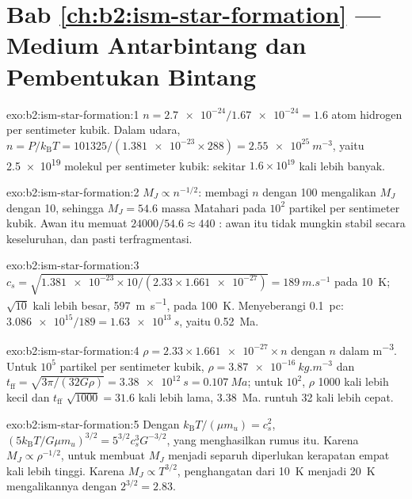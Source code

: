 \section*{Bab \ref{ch:b2:ism-star-formation} --- Medium Antarbintang dan Pembentukan Bintang}

\begin{solution}{exo:b2:ism-star-formation:1}
$n = \num{2.7e-24}/\num{1.67e-24} = 1.6$ atom hidrogen per sentimeter kubik. Dalam udara,
$n = P/k_{\mathrm B}T = 101325/(\num{1.381e-23}\times288) = \qty{2.55e25}{m^{-3}}$,
yaitu \num{2.5e19} molekul per sentimeter kubik: sekitar $1.6\times10^{19}$ kali
lebih banyak.
\end{solution}

\begin{solution}{exo:b2:ism-star-formation:2}
$M_J \propto n^{-1/2}$: membagi $n$ dengan 100 mengalikan $M_J$ dengan 10, sehingga
$M_J = 54.6$ massa Matahari pada $10^2$ partikel per sentimeter kubik. Awan itu memuat
$\num{24000}/54.6 \approx 440$ : awan itu tidak mungkin stabil secara keseluruhan, dan pasti
terfragmentasi.
\end{solution}

\begin{solution}{exo:b2:ism-star-formation:3}
$c_s = \sqrt{\num{1.381e-23}\times10/(2.33\times\num{1.661e-27})} =
\qty{189}{m.s^{-1}}$ pada \qty{10}{K}; $\sqrt{10}$ kali lebih besar, \qty{597}{m.s^{-1}},
pada \qty{100}{K}. Menyeberangi \qty{0.1}{pc}: $\num{3.086e15}/189 = \qty{1.63e13}{s}$,
yaitu \qty{0.52}{Ma}.
\end{solution}

\begin{solution}{exo:b2:ism-star-formation:4}
$\rho = 2.33\times\num{1.661e-27}\times n$ dengan $n$ dalam \unit{m^{-3}}. Untuk $10^5$
partikel per sentimeter kubik, $\rho = \qty{3.87e-16}{kg.m^{-3}}$ dan
$t_{\mathrm{ff}} = \sqrt{3\pi/(32G\rho)} = \qty{3.38e12}{s} = \qty{0.107}{Ma}$; untuk
$10^2$, $\rho$ \num{1000} kali lebih kecil dan $t_{\mathrm{ff}}$ $\sqrt{1000} = 31.6$
kali lebih lama, \qty{3.38}{Ma}.  runtuh 32 kali lebih cepat.
\end{solution}

\begin{solution}{exo:b2:ism-star-formation:5}
Dengan $k_{\mathrm B}T/(\mu m_u) = c_s^2$, $(5k_{\mathrm B}T/G\mu m_u)^{3/2} =
5^{3/2}c_s^3G^{-3/2}$, yang menghasilkan rumus itu. Karena $M_J \propto \rho^{-1/2}$,
untuk membuat $M_J$ menjadi separuh diperlukan kerapatan empat kali lebih tinggi. Karena $M_J \propto T^{3/2}$,
penghangatan dari \qty{10}{K} menjadi \qty{20}{K} mengalikannya dengan $2^{3/2} = 2.83$.
\end{solution}

